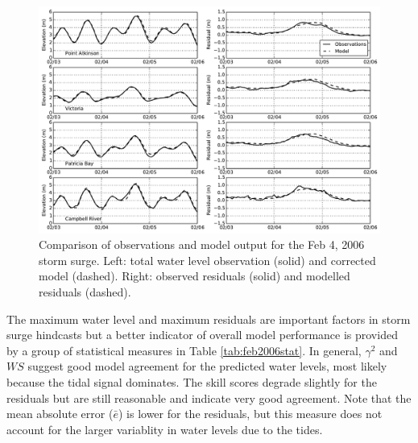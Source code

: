 \documentclass[pdftex,10pt]{article}
\begin{document}
\begin{figure}
\centering
\includegraphics[scale=0.6]{Figures/feb2006.pdf}
\caption{Comparison of observations and model output for the Feb 4, 2006 storm surge. Left: total water level observation (solid) and corrected model (dashed). Right: observed residuals (solid) and modelled residuals (dashed).}
\label{fig:feb2006}
\end{figure}

The maximum water level and maximum residuals are important factors in storm surge hindcasts but a better indicator of overall model performance is provided by a group of statistical measures in Table \ref{tab:feb2006stat}. In general, $\gamma^2$ and $WS$ suggest good model agreement for the predicted water levels, most likely because the tidal signal dominates. The skill scores degrade slightly for the residuals but are still reasonable and indicate very good agreement. Note that the mean absolute error ($\bar{e}$) is lower for the residuals, but this measure does not account for the larger variablity in water levels due to the tides.
\end{document}
